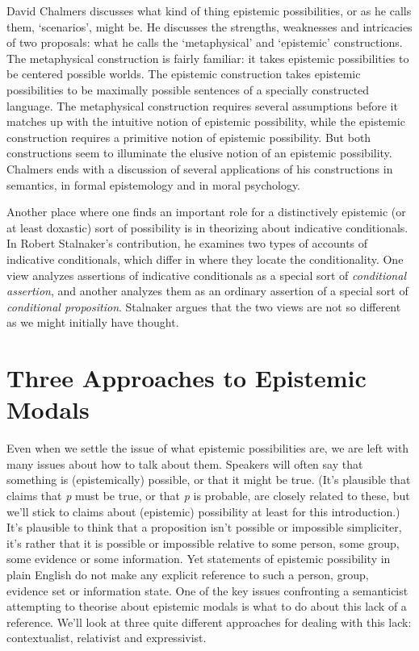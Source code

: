 \documentclass[
  10pt,
  letterpaper,
  DIV=11,
  numbers=noendperiod,
  twoside]{scrartcl}
\begin{document}
David Chalmers discusses what kind of thing epistemic possibilities, or
as he calls them, `scenarios', might be. He discusses the strengths,
weaknesses and intricacies of two proposals: what he calls the
`metaphysical' and `epistemic' constructions. The metaphysical
construction is fairly familiar: it takes epistemic possibilities to be
centered possible worlds. The epistemic construction takes epistemic
possibilities to be maximally possible sentences of a specially
constructed language. The metaphysical construction requires several
assumptions before it matches up with the intuitive notion of epistemic
possibility, while the epistemic construction requires a primitive
notion of epistemic possibility. But both constructions seem to
illuminate the elusive notion of an epistemic possibility. Chalmers ends
with a discussion of several applications of his constructions in
semantics, in formal epistemology and in moral psychology.

Another place where one finds an important role for a distinctively
epistemic (or at least doxastic) sort of possibility is in theorizing
about indicative conditionals. In Robert Stalnaker's contribution, he
examines two types of accounts of indicative conditionals, which differ
in where they locate the conditionality. One view analyzes assertions of
indicative conditionals as a special sort of \emph{conditional
assertion}, and another analyzes them as an ordinary assertion of a
special sort of \emph{conditional proposition}. Stalnaker argues that
the two views are not so different as we might initially have thought.

\section{Three Approaches to Epistemic
Modals}\label{three-approaches-to-epistemic-modals}

Even when we settle the issue of what epistemic possibilities are, we
are left with many issues about how to talk about them. Speakers will
often say that something is (epistemically) possible, or that it might
be true. (It's plausible that claims that \emph{p} must be true, or that
\emph{p} is probable, are closely related to these, but we'll stick to
claims about (epistemic) possibility at least for this introduction.)
It's plausible to think that a proposition isn't possible or impossible
simpliciter, it's rather that it is possible or impossible relative to
some person, some group, some evidence or some information. Yet
statements of epistemic possibility in plain English do not make any
explicit reference to such a person, group, evidence set or information
state. One of the key issues confronting a semanticist attempting to
theorise about epistemic modals is what to do about this lack of a
reference. We'll look at three quite different approaches for dealing
with this lack: contextualist, relativist and expressivist.
\end{document}
